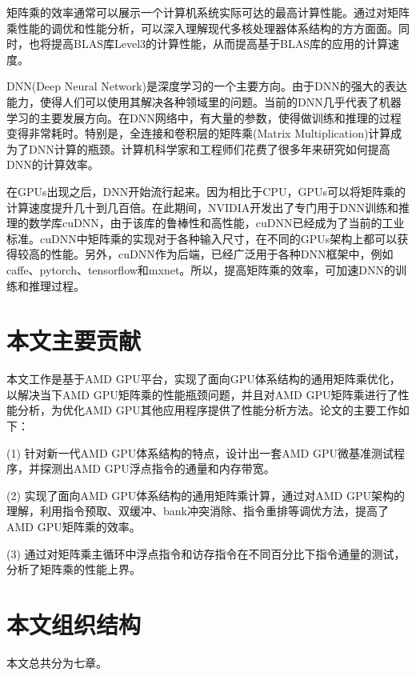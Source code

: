 矩阵乘的效率通常可以展示一个计算机系统实际可达的最高计算性能。通过对矩阵乘性能的调优和性能分析，可以深入理解现代多核处理器体系结构的方方面面。同时，也将提高BLAS库Level3的计算性能，从而提高基于BLAS库的应用的计算速度。

DNN(Deep Neural Network)是深度学习的一个主要方向。由于DNN的强大的表达能力，使得人们可以使用其解决各种领域里的问题。当前的DNN几乎代表了机器学习的主要发展方向。在DNN网络中，有大量的参数，使得做训练和推理的过程变得非常耗时。特别是，全连接和卷积层的矩阵乘(Matrix Multiplication)计算成为了DNN计算的瓶颈。计算机科学家和工程师们花费了很多年来研究如何提高DNN的计算效率。

在GPUs出现之后，DNN开始流行起来。因为相比于CPU，GPUs可以将矩阵乘的计算速度提升几十到几百倍。在此期间，NVIDIA开发出了专门用于DNN训练和推理的数学库cuDNN，由于该库的鲁棒性和高性能，cuDNN已经成为了当前的工业标准。cuDNN中矩阵乘的实现对于各种输入尺寸，在不同的GPUs架构上都可以获得较高的性能。另外，cuDNN作为后端，已经广泛用于各种DNN框架中，例如caffe、pytorch、tensorflow和mxnet。所以，提高矩阵乘的效率，可加速DNN的训练和推理过程。


\section{本文主要贡献}
本文工作是基于AMD GPU平台，实现了面向GPU体系结构的通用矩阵乘优化，以解决当下AMD GPU矩阵乘的性能瓶颈问题，并且对AMD GPU矩阵乘进行了性能分析，为优化AMD GPU其他应用程序提供了性能分析方法。论文的主要工作如下：

%


 (1) 针对新一代AMD GPU体系结构的特点，设计出一套AMD GPU微基准测试程序，并探测出AMD GPU浮点指令的通量和内存带宽。

 (2) 实现了面向AMD GPU体系结构的通用矩阵乘计算，通过对AMD GPU架构的理解，利用指令预取、双缓冲、bank冲突消除、指令重排等调优方法，提高了AMD GPU矩阵乘的效率。

 (3) 通过对矩阵乘主循环中浮点指令和访存指令在不同百分比下指令通量的测试，分析了矩阵乘的性能上界。


\section{本文组织结构}
本文总共分为七章。

